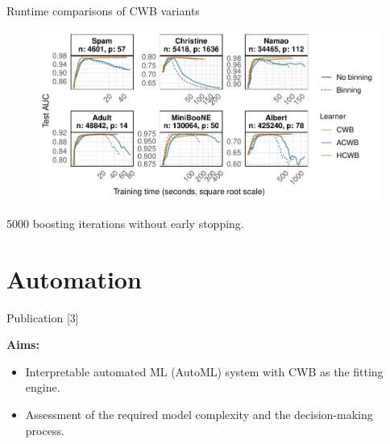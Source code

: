 \documentclass[t,10pt]{beamer}
\begin{document}
\begin{frame}{Runtime comparisons of CWB variants}
  \begin{figure}
    \centering
    \includegraphics[width=\textwidth]{figures/fig-cacb-runtimes.pdf}
  \end{figure}
  5000 boosting iterations without early stopping.
\end{frame}









\section*{Automation}

\begin{frame}{Publication [3]}
  \vspace{-0.2cm}
  \begin{figure}
    \centering
  \end{figure}
  \vspace{-0.4cm}

  \textbf{Aims:}
  \begin{itemize}
    \item
      Interpretable automated ML (AutoML) system with CWB as the fitting engine.
    \item
      Assessment of the required model complexity and the decision-making process.
  \end{itemize}
\end{frame}
\end{document}
